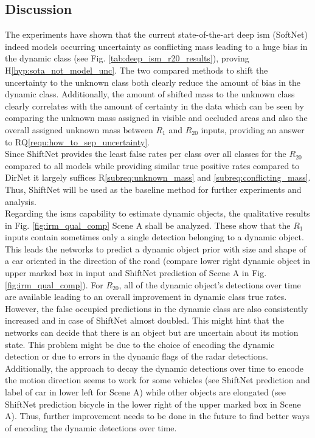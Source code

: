 \subsection{Discussion}
\label{subsec:discussion_aleat_uncert}
The experiments have shown that the current state-of-the-art deep \gls{ism} (SoftNet) indeed models occurring uncertainty as conflicting mass leading to a huge bias in the dynamic class (see Fig. \ref{tab:deep_ism_r20_results}), proving H\ref{hyp:sota_not_model_unc}. The two compared methods to shift the uncertainty to the unknown class both clearly reduce the amount of bias in the dynamic class. Additionally, the amount of shifted mass to the unknown class clearly correlates with the amount of certainty in the data which can be seen by comparing the unknown mass assigned in visible and occluded areas and also the overall assigned unknown mass between $R_1$ and $R_{20}$ inputs, providing an answer to RQ\ref{requ:how_to_sep_uncertainty}. 
\\
Since ShiftNet provides the least false rates per class over all classes for the $R_{20}$ compared to all models while providing similar true positive rates compared to DirNet it largely suffices R\ref{subreq:unknown_mass} and \ref{subreq:conflicting_mass}. Thus, ShiftNet will be used as the baseline method for further experiments and analysis.
\\
Regarding the \gls{ism}s capability to estimate dynamic objects, the qualitative results in Fig. \ref{fig:irm_qual_comp} Scene A shall be analyzed. These show that the $R_1$ inputs contain sometimes only a single detection belonging to a dynamic object. This leads the networks to predict a dynamic object prior with size and shape of a car oriented in the direction of the road (compare lower right dynamic object in upper marked box in input and ShiftNet prediction of Scene A in Fig. \ref{fig:irm_qual_comp}). For $R_{20}$, all of the dynamic object's detections over time are available leading to an overall improvement in dynamic class true rates. However, the false occupied predictions in the dynamic class are also consistently increased and in case of ShiftNet almost doubled. This might hint that the networks can decide that there is an object but are uncertain about its motion state. This problem might be due to the choice of encoding the dynamic detection or due to errors in the dynamic flags of the radar detections.\\
Additionally, the approach to decay the dynamic detections over time to encode the motion direction seems to work for some vehicles (see ShiftNet prediction and label of car in lower left for Scene A) while other objects are elongated (see ShiftNet prediction bicycle in the lower right of the upper marked box in Scene A). Thus, further improvement needs to be done in the future to find better ways of encoding the dynamic detections over time.
